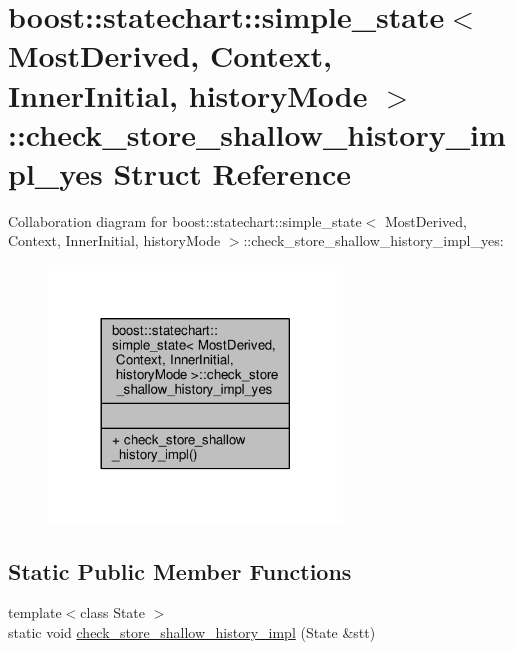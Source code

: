 \hypertarget{structboost_1_1statechart_1_1simple__state_1_1check__store__shallow__history__impl__yes}{}\section{boost\+:\+:statechart\+:\+:simple\+\_\+state$<$ Most\+Derived, Context, Inner\+Initial, history\+Mode $>$\+:\+:check\+\_\+store\+\_\+shallow\+\_\+history\+\_\+impl\+\_\+yes Struct Reference}
\label{structboost_1_1statechart_1_1simple__state_1_1check__store__shallow__history__impl__yes}


Collaboration diagram for boost\+:\+:statechart\+:\+:simple\+\_\+state$<$ Most\+Derived, Context, Inner\+Initial, history\+Mode $>$\+:\+:check\+\_\+store\+\_\+shallow\+\_\+history\+\_\+impl\+\_\+yes\+:
\nopagebreak
\begin{figure}[H]
\begin{center}
\leavevmode
\includegraphics[width=221pt]{structboost_1_1statechart_1_1simple__state_1_1check__store__shallow__history__impl__yes__coll__graph}
\end{center}
\end{figure}
\subsection*{Static Public Member Functions}
\begin{DoxyCompactItemize}
\item 
{\footnotesize template$<$class State $>$ }\\static void \mbox{\hyperlink{structboost_1_1statechart_1_1simple__state_1_1check__store__shallow__history__impl__yes_a8e25e5708de1577ac66e2dd73851de46}{check\+\_\+store\+\_\+shallow\+\_\+history\+\_\+impl}} (State \&stt)
\end{DoxyCompactItemize}



